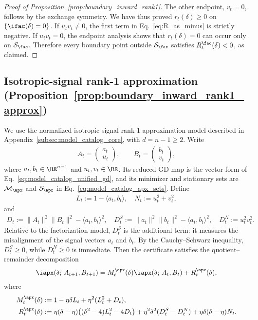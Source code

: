 \documentclass{article}
\begin{document}
\begin{proof}[Proof of Proposition~\ref{prop:boundary_inward_rank1}]
The other endpoint, $v_t=0$, follows by the exchange symmetry. We have thus
proved $r_t(\delta)\ge0$ on $\{\ifac(\delta)=0\}$. If $u_tv_t\ne0$, the first
term in Eq.~\eqref{eq:R_as_minus} is strictly negative. If $u_tv_t=0$, the
endpoint analysis shows that $r_t(\delta)=0$ can occur only on
$\mathcal S_\fac$. Therefore every boundary point outside $\mathcal S_\fac$ satisfies
$R_t^\fac(\delta)<0$, as claimed.
\end{proof}

\subsection{Isotropic-signal rank-1 approximation
(Proposition~\ref{prop:boundary_inward_rank1_approx})}
\label{app:boundary_inward_apx}
We use the normalized isotropic-signal rank-1 approximation model described in
Appendix~\ref{subsec:model_catalog_core}, with $d=n-1\ge2$. Write
\begin{align}
    A_t=\begin{pmatrix}a_t\\u_t\end{pmatrix},
    \qquad
    B_t=\begin{pmatrix}b_t\\v_t\end{pmatrix},
\end{align}
where $a_t,b_t\in\RR^{n-1}$ and $u_t,v_t\in\RR$. Its reduced GD map is the
vector form of Eq.~\eqref{eq:model_catalog_unified_gd}, and its minimizer and
stationary sets are $\mathcal M_\apx$ and $\mathcal S_\apx$ in
Eq.~\eqref{eq:model_catalog_apx_sets}.
Define
\begin{align}
    L_t := 1-\langle a_t,b_t\rangle,
    \quad
    N_t := u_t^2+v_t^2,
\end{align}
and
\begin{align}
    D_t
    := \|A_t\|^2\|B_t\|^2-\langle a_t,b_t\rangle^2,\quad
    D_t^S
    := \|a_t\|^2\|b_t\|^2-\langle a_t,b_t\rangle^2,\quad
    D_t^N
    := u_t^2v_t^2.
\end{align}
Relative to the factorization model, $D_t^S$ is the additional term: it
measures the misalignment of the signal vectors $a_t$ and $b_t$.
By the Cauchy--Schwarz inequality, $D_t^S\ge0$, while $D_t^N\ge0$ is immediate.
Then the certificate satisfies the quotient--remainder decomposition
\begin{align}
    \iapx(\delta;\,A_{t+1},B_{t+1})
    =
    M_t^\apx(\delta)\iapx(\delta;\,A_t,B_t)+R_t^\apx(\delta),
\end{align}
where
\begin{align}
    M_t^\apx(\delta)
    &:=
    1-\eta\delta L_t+\eta^2(L_t^2+D_t),\\
    R_t^\apx(\delta)
    &:=
    \eta(\delta-\eta)\bigl((\delta^2-4)L_t^2-4D_t\bigr)
    +\eta^2\delta^2(D_t^S-D_t^N)
    +\eta\delta(\delta-\eta)N_t.
\end{align}
\end{document}
